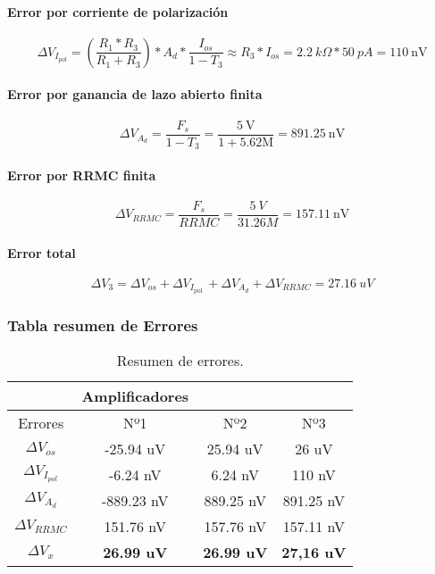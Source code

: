 \paragraph{Error por corriente de polarización}
\begin{equation*}
    \Delta V_{I_{p o l}}=\left(\frac{R_1 * R_3}{R_1+R_3}\right) * A_d * \frac{I_{o s}}{1-T_3} \approx R_3 * I_{o s}=2.2 ~k \Omega * 50 ~p A=110 ~\mathrm{nV}
\end{equation*}
\paragraph{Error por ganancia de lazo abierto finita}
\begin{equation*}
    \Delta V_{A_d}=\frac{F_s}{1-T_3}=\frac{5 ~\mathrm{V}}{1+5.62 \mathrm{M}} =891.25~ \mathrm{nV}
\end{equation*}
\paragraph{Error por RRMC finita}
    \begin{equation*}
        \Delta V_{R R M C}=\frac{F_s}{RRMC}= \frac{5~V}{31.26M} = 157.11 ~\mathrm{nV}
    \end{equation*}
\paragraph{Error total}
\begin{equation*}
    \Delta V_3=\Delta V_{o s}+\Delta V_{I_{\text {pol }}}+\Delta V_{A_d}+\Delta V_{R R M C} = 27.16 ~u V
\end{equation*}  
\subsubsection{Tabla resumen de Errores}
\begin{table}[H]
\centering
\caption{Resumen de errores.}
\label{tab:my-table}
\begin{tabular}{|c|c|c|c|}
\hline
\multicolumn{1}{|l|}{} & \cellcolor[HTML]{FFCC67}Amplificadores & \multicolumn{1}{l|}{\cellcolor[HTML]{FFCC67}} & \multicolumn{1}{l|}{\cellcolor[HTML]{FFCC67}} \\ \hline
\rowcolor[HTML]{FFCC67} 
\cellcolor[HTML]{F8FF00}Errores & Nº1 & Nº2 & Nº3 \\ \hline
\cellcolor[HTML]{F8FF00}$\Delta V_{o s}$ & -25.94 uV & 25.94 uV & 26 uV \\ \hline
\cellcolor[HTML]{F8FF00}$\Delta V_{I_{p o l}}$ & -6.24 nV & 6.24 nV & 110 nV \\ \hline
\cellcolor[HTML]{F8FF00}$\Delta V_{A_d}$ & -889.23 nV & 889.25 nV & 891.25 nV \\ \hline
\cellcolor[HTML]{F8FF00}$\Delta V_{R R M C}$ & 151.76 nV & 157.76 nV & 157.11 nV \\ \hline
\rowcolor[HTML]{34FF34} 
\cellcolor[HTML]{F8FF00}$\Delta V_x$ & \textbf{26.99 uV} & \textbf{26.99 uV} & \textbf{27,16 uV} \\ \hline
\end{tabular}
\end{table}

